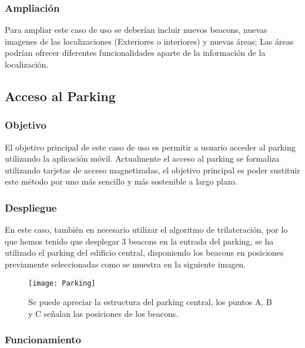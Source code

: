\subsubsection{Ampliación}

Para ampliar este caso de uso se deberían incluir nuevos beacons, nuevas imagenes de las localizaciones (Exteriores o interiores) y nuevas áreas; Las áreas podrían ofrecer diferentes funcionalidades aparte de la información de la localización.


\subsection{Acceso al Parking}

\subsubsection{Objetivo}

El objetivo principal de este caso de uso es permitir a usuario acceder al parking utilizando la aplicación móvil. Actualmente el acceso al parking se formaliza utilizando tarjetas de acceso magnetizadas, el objetivo principal es poder sustituir este método por uno más sencillo y más sostenible a largo plazo. 

\subsubsection{Despliegue}

En este caso, también en necesario utilizar el algoritmo de trilateración, por lo que hemos tenido que desplegar 3 beacons en la entrada del parking, se ha utilizado el parking del edificio central, disponiendo los beacons en posiciones previamente seleccionadas como se muestra en la siguiente imagen.

\begin{figure}[H]
	\centering
	\texttt{[image: Parking]}
	\label{fig:parking}
	\caption{Se puede apreciar la estructura del parking central, los puntos A, B y C señalan las posiciones de los beacons.}
\end{figure}

\subsubsection{Funcionamiento}


